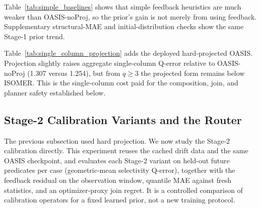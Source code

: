 \documentclass[preprint,12pt]{elsarticle}
\newcommand{\oasisUseMaxWidthResize}[1]{%
  \renewcommand{\resizebox}[3]{\adjustbox{max width=#1}{##3}}%
}
\begin{document}
\begingroup
\oasisUseMaxWidthResize{.84\columnwidth}

\endgroup

Table~\ref{tab:simple_baselines} shows that simple feedback heuristics are much
weaker than OASIS-noProj, so the prior's gain is not merely from using feedback.
Supplementary structural-MAE and initial-distribution checks show the same
Stage-1 prior trend.

\begingroup
\let\oasisOriginalCaption\caption
\renewcommand{\small}{\footnotesize}
\renewcommand{\caption}[1]{\oasisOriginalCaption{Single-column selectivity
Q-error ($\downarrow$) of OASIS versus the OASIS-noProj ablation, on
in-distribution compound drift. At mild drift $q=1$, ISOMER is lowest; from
$q\geq3$, OASIS stays below ISOMER, so the deployed hard-projected form
preserves a learned single-column advantage in the moderate-to-large drift
regime. The projection costs only a small amount relative to the stage-1
ablation, the price paid for the downstream composition and join safety shown in
Tables~\ref{tab:composition_family} and \ref{tab:factorjoin}.}}

\endgroup

Table~\ref{tab:single_column_projection} adds the deployed hard-projected OASIS.
Projection slightly raises aggregate single-column Q-error relative to
OASIS-noProj (1.307 versus 1.254), but from $q\geq3$ the projected form remains
below ISOMER. This is the single-column cost paid for the composition, join, and
planner safety established below.

\subsection{Stage-2 Calibration Variants and the Router}
\label{sec:stage2-calibration}

The previous subsection used hard projection. We now study the Stage-2
calibration directly. This experiment reuses the cached drift data and the same
OASIS checkpoint, and evaluates each Stage-2 variant on held-out future
predicates per case (geometric-mean selectivity Q-error), together with the
feedback residual on the observation window, quantile MAE against fresh
statistics, and an optimizer-proxy join regret. It is a controlled comparison of
calibration operators for a fixed learned prior, not a new training protocol.


\end{document}
